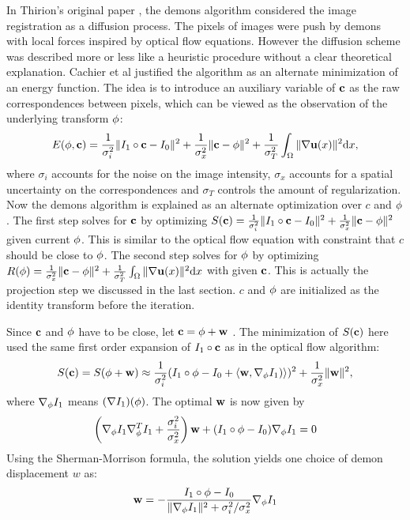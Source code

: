 \documentclass[letterpaper,12pt]{article}
\begin{document}
In Thirion's original paper \cite{Thirion98}, the demons algorithm considered the image registration as a diffusion process. The pixels of images were push by demons with local forces inspired by optical flow equations. However the diffusion scheme was described more or less like a heuristic procedure without a clear theoretical explanation. Cachier et al \cite{Cachier2003} justified the algorithm as an alternate minimization of an energy function. The idea is to introduce an auxiliary variable of $\mathbf{c}$ as the raw correspondences between pixels, which can be viewed as the observation of the underlying transform $\phi$:
\begin{align}
E(\phi,\mathbf{c})= \frac{1}{\sigma_i^2}\| I_1 \circ \mathbf{c} - I_0 \|^2
+\frac{1}{\sigma_x^2} \|\mathbf{c} - \phi\|^2
+\frac{1}{\sigma_T^2} \int_\Omega \| \nabla\mathbf{u}(x)\|^2 \text{d} x,
\end{align}
where $\sigma_i$ accounts for the noise on the image intensity, $\sigma_x$ accounts for a spatial uncertainty on the correspondences and $\sigma_T$ controls the amount of regularization. Now the demons algorithm is explained as an alternate optimization over $c$ and $\phi$. The first step solves for $\mathbf{c}$ by optimizing $S(\mathbf{c}) = \frac{1}{\sigma_i^2}\| I_1 \circ \mathbf{c} - I_0 \|^2 +\frac{1}{\sigma_x^2} \|\mathbf{c} - \phi\|^2 $ given current $\phi$. 
This is similar to the optical flow equation with constraint that $c$ should be close to $\phi$. 
The second step solves for $\phi$ by optimizing $R(\phi) = \frac{1}{\sigma_x^2} \|\mathbf{c} - \phi\|^2+\frac{1}{\sigma_T^2} \int_\Omega \| \nabla\mathbf{u}(x)\|^2 \text{d} x$ with given $\mathbf{c}$. 
This is actually the projection step we discussed in the last section. $c$ and $\phi$ are initialized as the identity transform before the iteration.

Since $\mathbf{c}$ and $\phi$ have to be close, let $\mathbf{c} = \phi + \mathbf{w}$ . The minimization of $S(\mathbf{c})$ here used the same first order expansion of $I_1 \circ \mathbf{c} $ as in the optical flow algorithm:
\begin{align}
S(\mathbf{c}) = S(\phi+\mathbf{w}) \approx
\frac{1}{\sigma_i^2} ( I_1 \circ \phi - I_0 + \langle \mathbf{w}, \nabla_{\phi} I_1 ) \rangle )^2 
+ \frac{1}{\sigma_x^2} \| \mathbf{w} \|^2,
\end{align}
where $\nabla_{\phi}I_1$ means $(\nabla I_1)(\phi)$. The optimal $\mathbf{w}$ is now given by 
\begin{align}
\left( \nabla_{\phi}I_1 \nabla_{\phi}^T I_1 
      + \frac{\sigma_i^2}{\sigma_x^2}  
\right) \mathbf{w} 
+ (I_1 \circ \phi - I_0 )\nabla_{\phi}I_1 = 0
\end{align}
Using the Sherman-Morrison formula, the solution yields one choice of demon displacement $w$ as:
\begin{align}
\mathbf{w} = -\frac{I_1 \circ \phi - I_0 }
           {\|\nabla_{\phi}I_1\|^2 + {\sigma_i^2}/{\sigma_x^2}}
           \nabla_{\phi}I_1
\label{eq:adddemonforce}           
\end{align}
\end{document}
